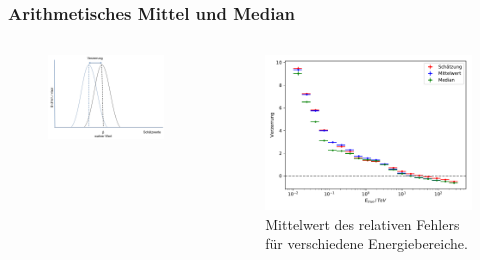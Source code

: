 \documentclass[aspectratio=1610, professionalfonts, 9pt]{beamer}
\begin{document}
  \begin{frame}
    \frametitle{Arithmetisches Mittel und Median}
    \begin{columns}
      \begin{figure}
        \includegraphics[width=\textwidth]{pictures/Bias.png}
        \caption{}
        \label{}
      \end{figure}
      \begin{figure}
        \includegraphics[width=\textwidth]{pictures/RF_mean_bias.pdf}
        \caption{Mittelwert des relativen Fehlers für verschiedene Energiebereiche.}
        \label{}
      \end{figure}
    \end{columns}
  \end{frame}
\end{document}
